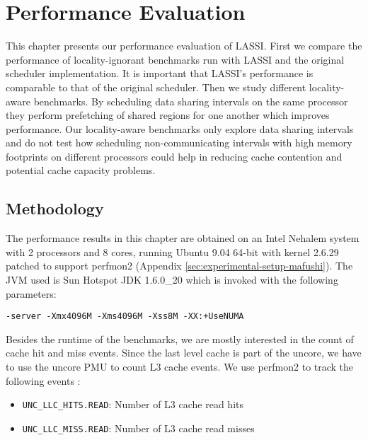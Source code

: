
\chapter{Performance Evaluation}
\label{chap:locality-performance}

This chapter presents our performance evaluation of LASSI. First we
compare the performance of locality-ignorant benchmarks run with LASSI
and the original scheduler implementation. It is important that
LASSI's performance is comparable to that of the original
scheduler. Then we study different locality-aware benchmarks. By
scheduling data sharing intervals on the same processor they perform
prefetching of shared regions for one another which improves
performance. Our locality-aware benchmarks only explore data sharing
intervals and do not test how scheduling non-communicating intervals
with high memory footprints on different processors could help in
reducing cache contention and potential cache capacity problems.

\section{Methodology}
\label{sec:locality-performance-methodology}

The performance results in this chapter are obtained on an Intel
Nehalem system with 2 processors and 8 cores, running Ubuntu 9.04
64-bit with kernel 2.6.29 patched to support perfmon2
\cite{Eranian2008} (Appendix
\ref{sec:experimental-setup-mafushi}). The JVM used is Sun Hotspot JDK
1.6.0\_20 which is invoked with the following parameters:

\begin{lstlisting}[style=Listing]
  -server -Xmx4096M -Xms4096M -Xss8M -XX:+UseNUMA
\end{lstlisting}

Besides the runtime of the benchmarks, we are mostly interested in the
count of cache hit and miss events. Since the last level cache is part
of the uncore, we have to use the uncore PMU to count L3 cache
events. We use perfmon2 to track the following events
\cite{Levinthal2009}:

\begin{itemize}
\item \lstinline!UNC_LLC_HITS.READ!: Number of L3 cache read hits
\item \lstinline!UNC_LLC_MISS.READ!: Number of L3 cache read misses
\end{itemize}

